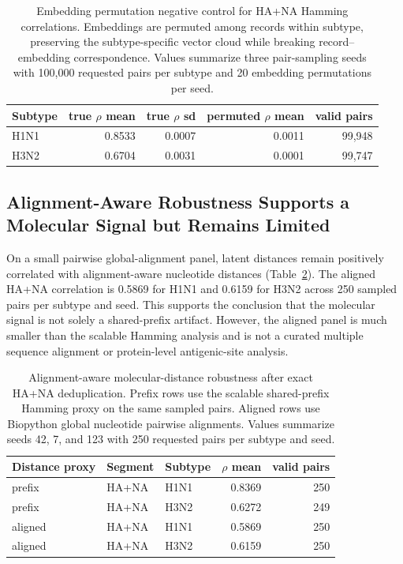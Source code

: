 \documentclass[11pt]{article}
\begin{document}
\begin{table}[H]
\centering
\caption{Embedding permutation negative control for HA+NA Hamming correlations. Embeddings are permuted among records within subtype, preserving the subtype-specific vector cloud while breaking record--embedding correspondence. Values summarize three pair-sampling seeds with 100,000 requested pairs per subtype and 20 embedding permutations per seed.}
\label{tab:embedding-permutation}
\begin{tabular}{lrrrr}
\toprule
Subtype & true $\rho$ mean & true $\rho$ sd & permuted $\rho$ mean & valid pairs \\
\midrule
H1N1 & 0.8533 & 0.0007 & 0.0011 & 99,948 \\
H3N2 & 0.6704 & 0.0031 & 0.0001 & 99,747 \\
\bottomrule
\end{tabular}
\end{table}

\subsection{Alignment-Aware Robustness Supports a Molecular Signal but Remains Limited}

On a small pairwise global-alignment panel, latent distances remain positively correlated with alignment-aware nucleotide distances (Table~\ref{tab:alignment-robustness}). The aligned HA+NA correlation is 0.5869 for H1N1 and 0.6159 for H3N2 across 250 sampled pairs per subtype and seed. This supports the conclusion that the molecular signal is not solely a shared-prefix artifact. However, the aligned panel is much smaller than the scalable Hamming analysis and is not a curated multiple sequence alignment or protein-level antigenic-site analysis.

\begin{table}[H]
\centering
\caption{Alignment-aware molecular-distance robustness after exact HA+NA deduplication. Prefix rows use the scalable shared-prefix Hamming proxy on the same sampled pairs. Aligned rows use Biopython global nucleotide pairwise alignments. Values summarize seeds 42, 7, and 123 with 250 requested pairs per subtype and seed.}
\label{tab:alignment-robustness}
\begin{tabular}{lllrr}
\toprule
Distance proxy & Segment & Subtype & $\rho$ mean & valid pairs \\
\midrule
prefix & HA+NA & H1N1 & 0.8369 & 250 \\
prefix & HA+NA & H3N2 & 0.6272 & 249 \\
aligned & HA+NA & H1N1 & 0.5869 & 250 \\
aligned & HA+NA & H3N2 & 0.6159 & 250 \\
\bottomrule
\end{tabular}
\end{table}
\end{document}
